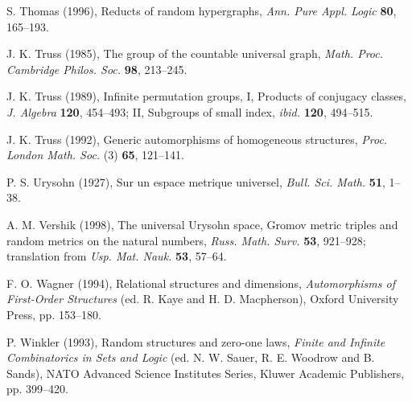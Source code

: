 \documentclass[12pt]{article}
\begin{document}
\begin{thebibliography}{99}
S. Thomas (1996),
Reducts of random hypergraphs,
\textit{Ann. Pure Appl. Logic} \textbf{80}, 165--193.

J. K. Truss (1985),
The group of the countable universal graph,
\textit{Math. Proc. Cambridge Philos. Soc.} \textbf{98}, 213--245.

J. K. Truss (1989),
Infinite permutation groups, I, Products of conjugacy classes,
\textit{J. Algebra} \textbf{120}, 454--493;
II, Subgroups of small index,
\textit{ibid.} \textbf{120}, 494--515.

J. K. Truss (1992),
Generic automorphisms of homogeneous structures,
\textit{Proc. London Math. Soc.} (3) \textbf{65}, 121--141.

P. S. Urysohn (1927),
Sur un espace metrique universel,
\textit{Bull. Sci. Math.} \textbf{51}, 1--38.

A. M. Vershik (1998),
The universal Urysohn space, Gromov metric triples and random metrics on the
natural numbers,
\textit{Russ. Math. Surv.} \textbf{53}, 921--928; translation from
\textit{Usp. Mat. Nauk.} \textbf{53}, 57--64.

F. O. Wagner (1994),
Relational structures and dimensions,
\textit{Automorphisms of First-Order Structures} (ed. R. Kaye and H. D.
Macpherson), Oxford University Press, pp. 153--180.

P. Winkler (1993),
Random structures and zero-one laws,
\textit{Finite and Infinite Combinatorics in Sets and Logic}
(ed. N. W. Sauer, R. E. Woodrow and B. Sands),
NATO Advanced Science Institutes Series, Kluwer Academic Publishers,
pp. 399--420.

\end{thebibliography}
\end{document}
